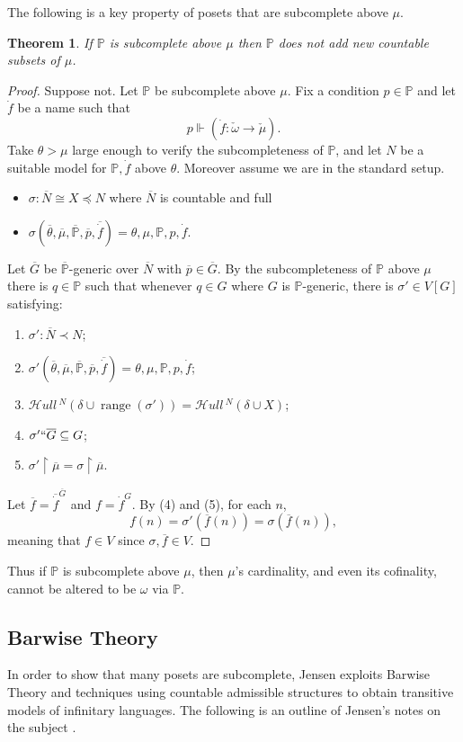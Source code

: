 \documentclass{amsart}
\newtheorem{theorem}{Theorem}[section]
\theoremstyle{definition}
\theoremstyle{remark}
\renewcommand{\P}{\mathbb{P}}
\newcommand{\N}{{\overline{N}}}
\newcommand{\G}{\overline{G}}
\DeclareMathOperator{\ran}{range}
\newcommand{\forces}{\Vdash}
\newcommand{\rest}{\mathbin{\upharpoonright}}
\newcommand{\SH}{\mathcal{H}\textit{ull} \,}
\newcommand{\sk}[3]{\SH^{#1}( {#2} \cup {\ran(#3)} ) }
\newcommand{\Sk}[3]{\SH^{#1}( {#2} \cup {#3} ) }
\begin{document}
The following is a key property of posets that are subcomplete above \(\mu\).
\begin{theorem} If $\P$ is subcomplete above $\mu$ then $\P$ does not add new countable subsets of $\mu$. \end{theorem}
\begin{proof}
Suppose not. Let $\P$ be subcomplete above $\mu$. 
Fix a condition \(p\in\P\) and let $\dot{f}$ be a name such that
	$$p \forces \left( \dot f: \check \omega \to \check{\mu} \right).$$ 
Take $\theta > \mu$ large enough to verify the subcompleteness of $\P$, and let $N$ be a suitable model for $\P, \dot f$ above $\theta$. Moreover assume we are in the standard setup.
\begin{itemize}
	\item $\sigma: \N \cong X \preccurlyeq N$ where $\N$ is countable and full
	\item $\sigma(\overline \theta, \overline \mu, \overline{\P}, \overline p, \overline{\dot f})=\theta, \mu, \P, p, \dot f$.
\end{itemize}
Let $\G$ be $\overline{\P}$-generic over $\N$ with $\overline p \in \overline G$. By the subcompleteness of $\P$ above $\mu$ there is $q \in \P$ such that whenever $q \in G$ where $G$ is $\P$-generic, there is $\sigma' \in V[G]$ satisfying: \begin{enumerate}
	\item $\sigma': \N \prec N$;
	\item $\sigma'(\overline \theta, \overline \mu, \overline{\P}, \overline p, \overline{\dot f})=\theta, \mu, \P, p, \dot f$;
	\item $\sk{N}{\delta}{\sigma'} = \Sk{N}{\delta}{X}$;
	\item $\sigma'``\G \subseteq G$;
	\item $\sigma' \rest \overline \mu = \sigma \rest \overline \mu$.
\end{enumerate}
Let $\overline f = \overline{\dot f}^{\G}$ and $f = \dot f^G$. By (4) and (5), for each $n$, $$f(n)=\sigma'(\overline f(n)) = \sigma(\overline f(n)),$$ meaning that $f \in V$ since $\sigma,\overline{f} \in V$.
\end{proof}
Thus if $\P$ is subcomplete above $\mu$, then $\mu$'s cardinality, and even its cofinality, cannot be altered to be $\omega$ via $\P$.



\subsection{Barwise Theory}
\label{subsec:BarwiseTheory}
In order to show that many posets are subcomplete, Jensen exploits Barwise Theory and techniques using countable admissible structures to obtain transitive models of infinitary languages.  The following is an outline of Jensen's notes on the subject \cite[Chapter 1 \& 2]{Jensen:2014}. 
\end{document}
